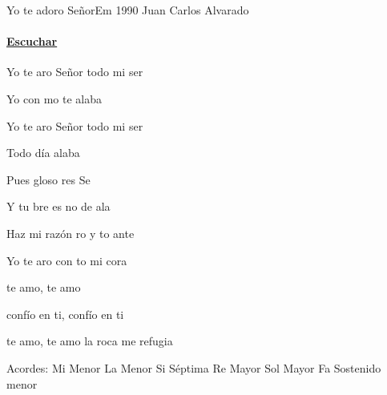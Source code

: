 \documentclass[12pt, spanish]{book}
\begin{document}
    \begin{song}{Yo te adoro Señor}{Em}
        {1990} %
        {Juan Carlos Alvarado}
        {} %
        {}
        \ifChordBk
        \paragraph{\mbox{}\hfill\protect\href{https://open.spotify.com/intl-es/track/67MZC1yGDxTBqeauqjxYVz}{Escuchar}\mbox{}\hfill}
        \fi


        \begin{SBOpGroup}
            Yo te aro Señor  todo mi ser

            Yo con mo te alaba

            Yo te aro Señor  todo mi ser

            Todo  día  alaba
        \end{SBOpGroup}

        \begin{SBOpGroup}
            Pues  gloso res Se

            Y tu bre es no de ala 

            Haz mi razón ro y to ante 

            Yo te aro con to mi cora
        \end{SBOpGroup}

        \begin{SBOpGroup}
             te amo,  te amo

             confío en ti,  confío en ti

             te amo,  te amo  la roca me refugia
        \end{SBOpGroup}

        \ifChordBk
        \begin{SBOpGroup}
            Acordes:\break
            \upchord{\Em}\qquad Mi Menor \hfill
            \upchord{\Am}\qquad La Menor \hfill\null\break
            \upchord{\Bseven}\qquad\qquad Si S\'eptima \hfill
            \upchord{\D}\qquad Re Mayor \hfill\null\break
            \upchord{\G}\qquad Sol Mayor \hfill
            \upchord{\Fsm}\quad Fa Sostenido menor \hfill\null\break
        \end{SBOpGroup}
        \fi
    \end{song}
\end{document}
